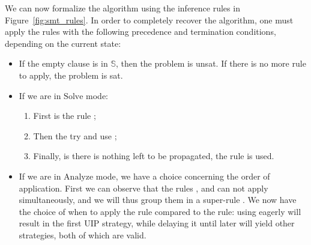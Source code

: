 \documentclass{article}
\begin{document}
We can now formalize the \cdcl{} algorithm using the inference rules
in Figure~\ref{fig:smt_rules}. In order to completely recover the \sat{} algorithm,
one must apply the rules with the following precedence and termination conditions,
depending on the current state:
\begin{itemize}
  \item If the empty clause is in $\mathbb{S}$, then the problem is unsat.
    If there is no more rule to apply, the problem is sat.
  \item If we are in $\text{Solve}$ mode:
    \begin{enumerate}
      \item First is the rule ;
      \item Then the try and use ;
      \item Finally, is there is nothing left to be propagated, the 
        rule is used.
    \end{enumerate}
  \item If we are in $\text{Analyze}$ mode, we have a choice concerning
    the order of application. First we can observe that the rules
    ,  and 
    can not apply simultaneously, and we will thus group them in a super-rule
    . We now have the choice of when to apply the  rule
    compared to the  rule:
    using  eagerly will result in the first UIP strategy, while delaying it
    until later will yield other strategies, both of which are valid.
\end{itemize}
\end{document}
